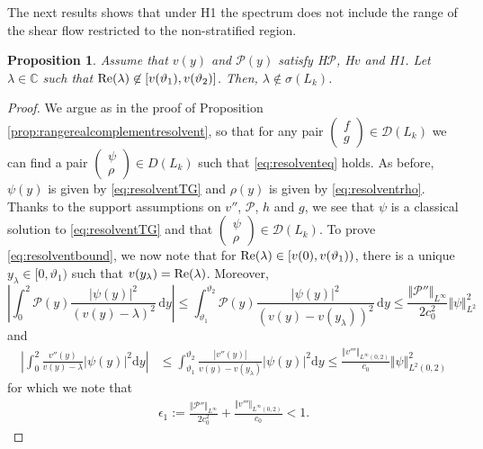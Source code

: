 \documentclass[11pt,reqno]{amsproc}
\newtheorem{proposition}{Proposition}[section]
\theoremstyle{definition}
\numberwithin{equation}{section}
\newcommand{\C}{{\mathbb C}}
\renewcommand{\d}{\mathrm{d}}
\renewcommand{\P}{{\mathcal{P}}}
\def\Re{{\rm Re}}
\begin{document}
The next results shows that under H1 the spectrum does not include the range of the shear flow restricted to the non-stratified region.

\begin{proposition}\label{prop:nonstratifiedresolvent}
Assume that $v(y)$ and $\P(y)$ satisfy {H$\P$, H$v$} and H1. Let $\lambda\in \C$ such that $\Re(\lambda) \not \in [v(\vartheta_1), v(\vartheta_2)]$. Then, $\lambda\not \in \sigma(L_k)$.
\end{proposition}

\begin{proof}
We argue as in the proof of Proposition \ref{prop:rangerealcomplementresolvent}, so that for any pair $\begin{pmatrix}
f \\ g
\end{pmatrix}\in \mathcal{D}(L_k)$ we can find a pair $\begin{pmatrix}
\psi \\ \rho
\end{pmatrix}\in D(L_k)$ such that \eqref{eq:resolventeq} holds. As before, $\psi(y)$ is given by \eqref{eq:resolventTG} and $\rho(y)$ is given by \eqref{eq:resolventrho}. Thanks to the support assumptions on $v''$, $\P$, $h$ and $g$, we see that $\psi$ is a classical solution to \eqref{eq:resolventTG} and that $\begin{pmatrix}
\psi \\ \rho
\end{pmatrix}\in \mathcal{D}(L_k)$. To prove \eqref{eq:resolventbound}, we now note that for $\Re(\lambda)\in [v(0), v(\vartheta_1))$, there is a unique $y_\lambda\in [0, \vartheta_1)$ such that $v(y_\lambda) = \Re(\lambda)$. Moreover,
\begin{equation*}
\left|\int_0^2 \P(y) \frac{|\psi(y)|^2}{(v(y) - \lambda)^2} \, \d y\right| \leq  \int_{\vartheta_1}^{\vartheta_2} \P(y) \frac{|\psi(y)|^2}{(v(y) - v(y_\lambda))^2}\, \d y \leq \frac{\Vert \P'' \Vert_{L^\infty}}{2 c_0^2} \Vert \psi \Vert_{L^2}^2
\end{equation*}
and
\begin{align*}
\left| \int_0^2 \frac{v''(y)}{v(y) - \lambda}|\psi(y)|^2 \d y \right| &\leq \int_{\vartheta_1}^{\vartheta_2} \frac{|v''(y)|}{v(y) - v(y_\lambda)}|\psi(y)|^2 \d y \leq \frac{\Vert v''' \Vert_{L^\infty(0,2)}}{c_0} \Vert \psi \Vert_{L^2(0,2)}^2
\end{align*}
for which we note that
\begin{align*}
\epsilon_1 := \frac{\Vert \P'' \Vert_{L^\infty}}{2 c_0^2} + \frac{\Vert v''' \Vert_{L^\infty(0,2)}}{c_0}  < 1.

\end{align*}
\end{proof}
\end{document}
